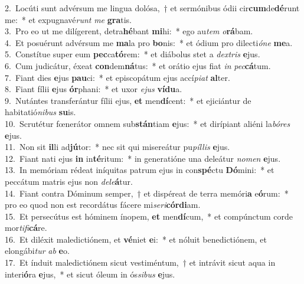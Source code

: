 {2.~}Locúti sunt advérsum me lingua dolósa,~† et sermónibus ódii cir\textbf{cum}de\textbf{dé}runt me:~* et expugnavé\textit{runt} \textit{me} \textbf{gra}tis.\\
{3.~}Pro eo ut me dilígerent, detra\textbf{hé}bant \textbf{mi}hi:~* ego au\textit{tem} \textit{o}\textbf{rá}bam.\\
{4.~}Et posuérunt advérsum me \textbf{ma}la pro \textbf{bo}nis:~* et ódium pro dilecti\textit{ó}\textit{ne} \textbf{me}a.\\
{5.~}Constítue super eum \textbf{pec}ca\textbf{tó}rem:~* et diábolus stet a \textit{dex}\textit{tris} \textbf{e}jus.\\
{6.~}Cum judicátur, éxeat \textbf{con}dem\textbf{ná}tus:~* et orátio ejus fiat \textit{in} \textit{pec}\textbf{cá}tum.\\
{7.~}Fiant dies \textbf{e}jus \textbf{pau}ci:~* et episcopátum ejus accí\textit{pi}\textit{at} \textbf{al}ter.\\
{8.~}Fiant fílii \textbf{e}jus \textbf{ór}phani:~* et uxor \textit{e}\textit{jus} \textbf{ví}\textbf{du}a.\\
{9.~}Nutántes transferántur fílii ejus, \textbf{et} men\textbf{dí}cent:~* et ejiciántur de habitatió\textit{ni}\textit{bus} \textbf{su}is.\\
{10.~}Scrutétur fœnerátor omnem sub\textbf{stán}tiam \textbf{e}jus:~* et dirípiant aliéni la\textit{bó}\textit{res} \textbf{e}jus.\\
{11.~}Non sit \textbf{il}li ad\textbf{jú}tor:~* nec sit qui misereátur pu\textit{píl}\textit{lis} \textbf{e}jus.\\
{12.~}Fiant nati ejus \textbf{in} in\textbf{té}ritum:~* in generatióne una deleátur \textit{no}\textit{men} \textbf{e}jus.\\
{13.~}In memóriam rédeat iníquitas patrum ejus in con\textbf{spé}ctu \textbf{Dó}mini:~* et peccátum matris ejus non \textit{de}\textit{le}\textbf{á}tur.\\
{14.~}Fiant contra Dóminum semper,~† et dispéreat de terra memóri\textbf{a} e\textbf{ó}rum:~* pro eo quod non est recordátus fácere mi\textit{se}\textit{ri}\textbf{cór}\textbf{di}am.\\
{15.~}Et persecútus est hóminem ínopem, \textbf{et} men\textbf{dí}cum,~* et compúnctum corde mor\textit{ti}\textit{fi}\textbf{cá}re.\\
{16.~}Et diléxit maledictiónem, et \textbf{vé}niet \textbf{e}i:~* et nóluit benedictiónem, et elongábi\textit{tur} \textit{ab} \textbf{e}o.\\
{17.~}Et índuit maledictiónem sicut vestiméntum,~† et intrávit sicut aqua in interi\textbf{ó}ra \textbf{e}jus,~* et sicut óleum in ós\textit{si}\textit{bus} \textbf{e}jus.\\
